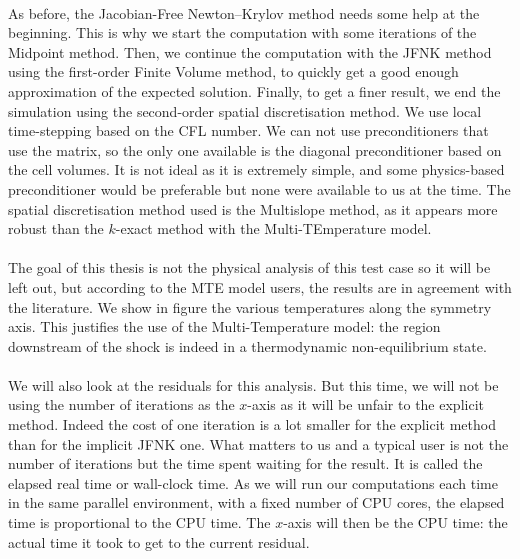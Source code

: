         \paragraph{}
        As before, the Jacobian-Free Newton--Krylov method needs some help at the beginning.
        This is why we start the computation with some iterations of the Midpoint method.
        Then, we continue the computation with the JFNK method using the first-order Finite Volume method, to quickly get a good enough approximation of the expected solution.
        Finally, to get a finer result, we end the simulation using the second-order spatial discretisation method.
        We use local time-stepping based on the CFL number.
        We can not use preconditioners that use the matrix, so the only one available is the diagonal preconditioner based on the cell volumes.
        It is not ideal as it is extremely simple, and some physics-based preconditioner would be preferable \cite{KnollKeyes2004} but none were available to us at the time.
        The spatial discretisation method used is the Multislope method, as it appears more robust than the $k$-exact method with the Multi-TEmperature model.

        \paragraph{}
        The goal of this thesis is not the physical analysis of this test case so it will be left out, but according to the MTE model users, the results are in agreement with the literature. 
        We show in figure  the various temperatures along the symmetry axis.
        This justifies the use of the Multi-Temperature model: the region downstream of the shock is indeed in a thermodynamic non-equilibrium state.

        \paragraph{}
        We will also look at the residuals for this analysis.
        But this time, we will not be using the number of iterations as the $x$-axis as it will be unfair to the explicit method.
        Indeed the cost of one iteration is a lot smaller for the explicit method than for the implicit JFNK one.
        What matters to us and a typical user is not the number of iterations but the time spent waiting for the result.
        It is called the elapsed real time or wall-clock time.
        As we will run our computations each time in the same parallel environment, with a fixed number of CPU cores, the elapsed time is proportional to the CPU time.
        The $x$-axis will then be the CPU time: the actual time it took to get to the current residual.

